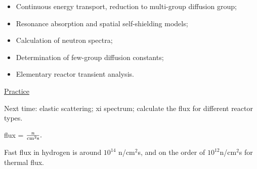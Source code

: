 \documentclass{school-22.211-notes}
\date{February  8, 2012}
\begin{document}
\maketitle

\begin{itemize}
  \item Continuous energy transport, reduction to multi-group diffusion group;
  \item Resonance absorption and spatial self-shielding models;
  \item Calculation of neutron spectra;
  \item Determination of few-group diffusion constants;
  \item Elementary reactor transient analysis.
\end{itemize}

\uline{Practice}


Next time: elastic scattering; xi spectrum; calculate the flux for different reactor types. 


flux = $\frac{n}{\mathrm{cm}^2 \mathrm{s}}.$

Fast flux in hydrogen is around $10^{14}$ n/cm$^2$s, and on the order of $10^{12}$n/cm$^2$s for thermal flux. 
\end{document}
